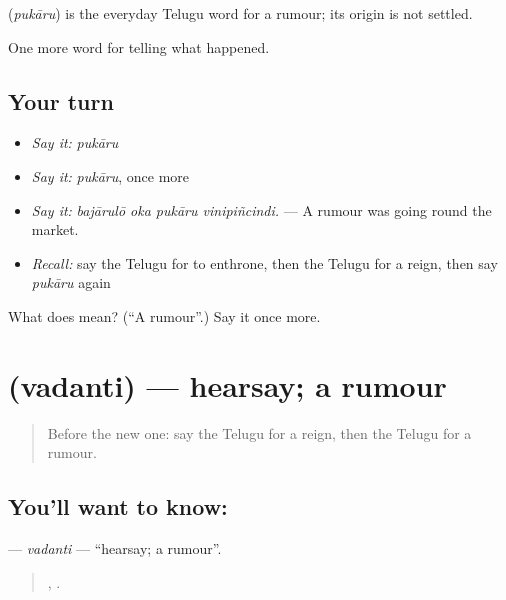 \begin{cousinweb}
\textbf{} (\emph{pukāru}) is the everyday Telugu word for a rumour; its origin is not settled.
\end{cousinweb}

\begin{grammarlens}[title={What you've built}]
One more word for telling what happened.
\end{grammarlens}

\subsection*{Your turn}
\begin{itemize}
\raggedright
  \item \emph{Say it:} \emph{pukāru}
  \item \emph{Say it:} \emph{pukāru}, once more
  \item \emph{Say it:} \emph{bajārulō oka pukāru vinipiñcindi.} — A rumour was going round the market.
  \item \emph{Recall:} say the Telugu for to enthrone, then the Telugu for a reign, then say \emph{pukāru} again
\end{itemize}

\begin{tcolorbox}[breakable,colback=teal!4,colframe=teal!35!black,title={Before you move on}]
What does  mean? (\textquotedblleft{}A rumour\textquotedblright{}.) Say it once more.
\end{tcolorbox}
\section[\texorpdfstring{\te{వదంతి} (vadanti)}{వదంతి (vadanti)}]{ (vadanti) — hearsay; a rumour}

\label{lesson:TE-C336-vadanti}



\begin{quote}
Before the new one: say the Telugu for a reign, then the Telugu for a rumour.
\end{quote}

\subsection*{You'll want to know: }
\textbf{} — \emph{vadanti} — \textquotedblleft{}hearsay; a rumour\textquotedblright{}.

\begin{quote}
  ,  .
\end{quote}

